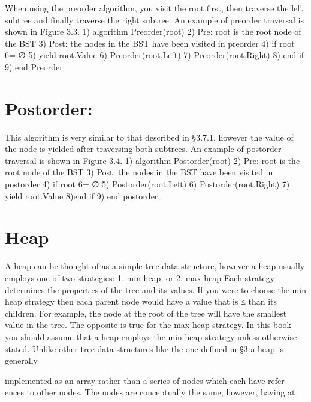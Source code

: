 \documentclass{article}
\begin{document}
When using the preorder algorithm, you visit the root first, then traverse the left
subtree and finally traverse the right subtree. An example of preorder traversal
is shown in Figure 3.3.
1) algorithm Preorder(root)
2) Pre: root is the root node of the BST
3) Post: the nodes in the BST have been visited in preorder
4) if root 6= ∅
5) yield root.Value
6) Preorder(root.Left)
7) Preorder(root.Right)
8) end if
9) end Preorder


\section{Postorder:}\label{sec:post}

This algorithm is very similar to that described in §3.7.1, however the value
of the node is yielded after traversing both subtrees. An example of postorder
traversal is shown in Figure 3.4.
1) algorithm Postorder(root)
2) Pre: root is the root node of the BST
3) Post: the nodes in the BST have been visited in postorder
4) if root 6= ∅
5) Postorder(root.Left)
6) Postorder(root.Right)
7) yield root.Value
8)end if
9) end postorder.

\section{Heap}\label{sec:heap}


A heap can be thought of as a simple tree data structure, however a heap usually
employs one of two strategies:
1. min heap; or
2. max heap
Each strategy determines the properties of the tree and its values. If you
were to choose the min heap strategy then each parent node would have a value
that is ≤ than its children. For example, the node at the root of the tree will
have the smallest value in the tree. The opposite is true for the max heap
strategy. In this book you should assume that a heap employs the min heap
strategy unless otherwise stated.
Unlike other tree data structures like the one defined in §3 a heap is generally

implemented as an array rather than a series of nodes which each have refer-
ences to other nodes. The nodes are conceptually the same, however, having at
\end{document}
